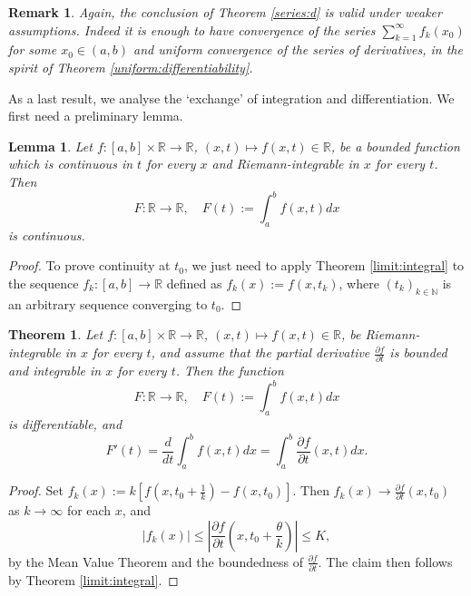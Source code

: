 \documentclass[a4paper,reqno]{amsart}
\numberwithin{equation}{section}
\newtheorem{lemma}[definition]{Lemma}
\newtheorem{theorem}[definition]{Theorem}
\newtheorem{remark}[definition]{Remark}
\def\N{\mathbb{N}}
\def\R{\mathbb{R}}
\begin{document}
\begin{remark}
Again, the conclusion of Theorem \ref{series:d} is valid under weaker assumptions. Indeed it is enough to have convergence of the series $\sum_{k=1}^\infty f_k(x_0)$ for some $x_0\in (a,b)$ and 
uniform convergence of the series of derivatives, in the spirit of Theorem \ref{uniform:differentiability}.
\end{remark}



As a last result, we analyse the `exchange' of integration and differentiation. We first need a preliminary lemma.

\begin{lemma}
Let $f: [a,b]\times \R \to \R$, $(x,t)\mapsto f(x,t)\in \R$, be a bounded function which is continuous in $t$ for every $x$ and Riemann-integrable in $x$ for every $t$. Then 
$$
F:\R\to \R, \quad F(t):= \int_a^b f(x,t) dx
$$
is continuous.
\end{lemma} 

\begin{proof}
To prove continuity at $t_0$, we just need to apply Theorem \ref{limit:integral} to the sequence $f_k:[a,b]\to \R$ defined as $f_k(x):= f(x,t_k)$, where $(t_k)_{k\in \N}$ is an arbitrary sequence converging to $t_0$.
\end{proof}

\begin{theorem}
Let $f: [a,b]\times \R \to \R$, $(x,t)\mapsto f(x,t)\in \R$, be Riemann-integrable in $x$ for every $t$, and assume that the partial derivative 
$\frac{\partial f}{\partial t}$ is bounded and integrable in $x$ for every $t$. Then the function 
$$
F:\R\to \R, \quad F(t):= \int_a^b f(x,t) dx
$$
is differentiable, and 
$$
F'(t) = \frac{d}{dt}  \int_a^b f(x,t) dx =  \int_a^b \frac{\partial f}{\partial t}(x,t) dx.
$$
\end{theorem}

\begin{proof}
Set $f_k(x):= k\left[f\left(x,t_0+\frac1k\right)-f(x,t_0)\right]$. Then $f_k(x)\to \frac{\partial f}{\partial t}(x,t_0)$ as $k\to \infty$ for each $x$, and 
$$
|f_k(x)| \leq \left|\frac{\partial f}{\partial t}\left(x,t_0+\frac\theta k\right)\right| \leq K,
$$
by the Mean Value Theorem and the boundedness of $\frac{\partial f}{\partial t}$. The claim then follows by Theorem \ref{limit:integral}.
\end{proof}

\end{document}
